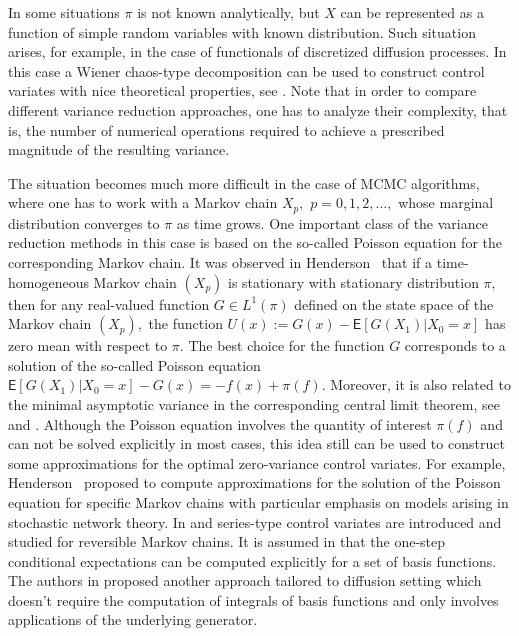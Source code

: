 \documentclass[preprint]{imsart}
\begin{document}
In some situations \(\pi\) is not known analytically, but \(X\) can be represented as a function of  simple random variables with known distribution.
Such  situation arises, for example, in the case of functionals of  discretized diffusion processes. In this case a Wiener chaos-type decomposition can be used to construct control variates with nice theoretical properties, see \cite{belomestny2018stratified}.
Note that in order to compare different  variance reduction approaches, one has to analyze their complexity, that is, the number of numerical operations required to achieve a prescribed magnitude of the resulting variance.


The situation becomes much more difficult in the case of MCMC algorithms, where one  has to work with a
Markov chain \(X_p,\) \(p=0,1,2,\ldots,\) whose marginal distribution  converges  to \(\pi\) as time grows. One important class of the variance reduction methods in this case  is based on the so-called Poisson equation for the corresponding  Markov chain. It was observed in Henderson~\cite{henderson1997variance}  that if a time-homogeneous Markov chain \((X_p)\) is stationary with stationary distribution \(\pi,\) then for any real-valued function \(G \in L^1(\pi) \) defined on the state space of the Markov chain \((X_p),\)  the function \(U(x) := G(x)-\mathsf{E}[G(X_{1})|X_0 = x]\) has zero mean with respect to \(\pi\).  The best choice for the function \(G\) corresponds to a solution of the so-called Poisson equation  \(\mathsf{E}[G(X_{1})|X_0 = x]-G(x)=-f(x)+\pi(f)\).  Moreover, it is also related to the minimal asymptotic variance in the corresponding central limit theorem, see \cite{duncan2016variance} and \cite{mira2013zero}.   Although the Poisson equation involves the quantity of interest \(\pi(f)\)  and can not be  solved explicitly in most cases, this idea still can be used to construct some  approximations for the optimal zero-variance control variates. For example,  Henderson~\cite{henderson1997variance} proposed to compute approximations for the solution of the Poisson equation for specific Markov chains with particular emphasis on models arising in stochastic network theory. In \cite{dellaportas2012control} and \cite{brosse2018diffusion}  series-type control variates are introduced and studied for reversible Markov chains. It is assumed in \cite{dellaportas2012control}  that the one-step conditional expectations  can be computed explicitly  for a set of basis functions. The authors in \cite{brosse2018diffusion} proposed another approach tailored to diffusion setting which doesn't require the computation of integrals of basis functions and only involves  applications of the underlying generator.
\end{document}
